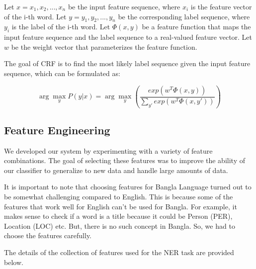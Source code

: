 \documentclass{article}
\begin{document}
Let $x = {x_1, x_2, ..., x_n}$ be the input feature sequence, where $x_i$ is the feature vector of the i-th word.
Let $y = {y_1, y_2, ..., y_n}$ be the corresponding label sequence, where $y_i$ is the label of the i-th word.
Let $\Phi(x, y)$ be a feature function that maps the input feature sequence and the label sequence to a real-valued feature vector.
Let $w$ be the weight vector that parameterizes the feature function.

The goal of CRF is to find the most likely label sequence given the input feature sequence, which can be formulated as:

$$
\arg\max_{y} P(y|x) = \arg\max_{y}\left(\frac{exp(w^T\Phi(x,y))}{\sum_{y'} exp(w^T\Phi(x,y'))}\right)
$$

\subsection{Feature Engineering}

We developed our system by experimenting with a variety of feature combinations. The goal of selecting these features was to improve the ability of our classifier to generalize to new data and handle large amounts of data.

It is important to note that choosing features for Bangla Language turned out to be somewhat challenging compared to English. This is because some of the features that work well for English can't be used for Bangla. For example, it makes sense to check if a word is a title because it could be Person (PER), Location (LOC) etc. But, there is no such concept in Bangla. So, we had to choose the features carefully. 

The details of the collection of features used for the NER task are provided below.
\end{document}

